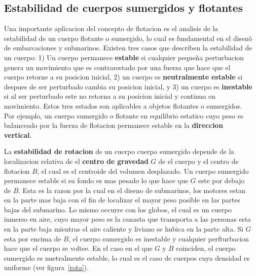 \documentclass[10pt, oneside]{article}
\begin{document}
\subsection{Estabilidad de cuerpos sumergidos y flotantes}
Una importante aplicacion del concepto de flotacion es el analisis de la estabilidad de un cuerpo flotante o sumergido, lo cual es fundamental en el disen\~o de embarcaciones y submarinos. Existen tres casos que describen la estabilidad de un cuerpo: 1) Un cuerpo permanece \textbf{estable} si cualquier peque\~na perturbacion genera un movimiento que es contrarestado por una fuerza que hace que el cuerpo retorne a su posicion inicial, 2) un cuerpo es \textbf{neutralmente estable} si despues de ser perturbado cambia su posicion inicial, y 3) un cuerpo es \textbf{inestable} si al ser perturbado este no retorna a su posicion inicial y continua en movimiento. Estos tres estados son aplicables a objetos flotantes o sumergidos. Por ejemplo, un cuerpo sumergido o flotante en equilibrio estatico cuyo peso es balanceado por la fuerza de flotacion permanece estable en la \textbf{direccion vertical}.

La \textbf{estabilidad de rotacion} de un cuerpo cuerpo sumergido depende de la localizacion relativa de el \textbf{centro de gravedad} $G$ de el cuerpo y el centro de flotacion $B$, el cual es el centroide del volumen desplazado. Un cuerpo sumergido permanece estable si su fondo es mas pesado lo que hace que $G$ este por debajo de $B$. Esta es la razon por la cual en el diseno de submarinos, los motores estan en la parte mas baja con el fin de localizar el mayor peso posible en las partes bajas del submarino. Lo mismo occurre con los globos, el cual es un cuerpo inmerso en aire, cuyo mayor peso es la canasta que transporta a las personas esta en la parte baja mientras el aire caliente y liviano se hubica en la parte alta. Si $G$ esta por encima de $B$, el cuerpo sumergido es inestable y cualquier perfturbacion hace que el cuerpo se voltee. En el caso en el que $G$ y $B$ coinciden, el cuerpo sumergido es nuetralmente estable, lo cual es el caso de cuerpos cuya densidad es uniforme (ver figura~\ref{rota}).
\end{document}
